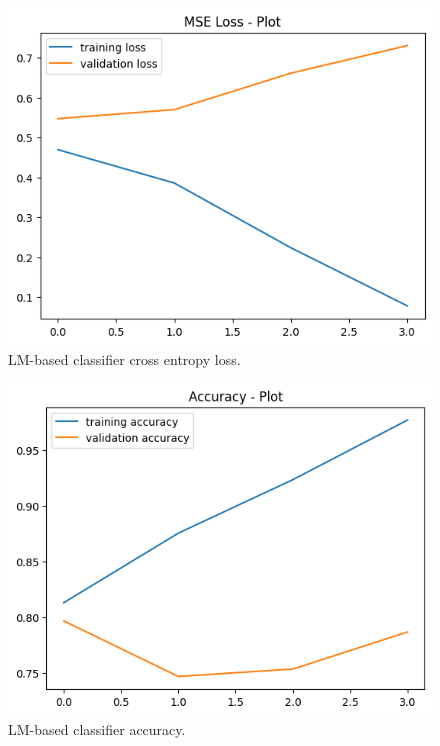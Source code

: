 \documentclass[11pt]{article}
\begin{document}
	\begin{figure}
		\includegraphics[width=\linewidth]{loss-yes-transformer.png}
		\caption{LM-based classifier cross entropy loss.}
		\label{fig:3}
	\end{figure}
	
	\begin{figure}
		\includegraphics[width=\linewidth]{accuracy-yes-transformer.png}
		\caption{LM-based classifier accuracy.}
		\label{fig:4}
	\end{figure}
	
	
\end{document}
